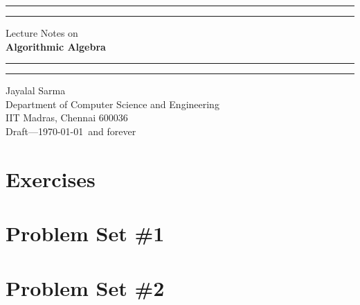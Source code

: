 \documentclass[11pt]{report}
\newcounter{excount}
\theoremstyle{plain}
\def\psetbackref{1}
\begin{document}
\thispagestyle{empty}

\begin{flushright}
\vspace*{3cm}
\makeatletter 
{}\p@ 
\hrule height 2pt
\p@
\hrule height 1pt
\p@
{\huge Lecture Notes on}\\[3ex]
{\Huge \textbf{Algorithmic Algebra}} 
\end{flushright}

\makeatletter 
{}\p@ 
\hrule height 2pt
\p@
\hrule height 1pt
\p@
\makeatother


\begin{flushleft}
{\large Jayalal Sarma\\ 
Department of Computer Science and Engineering\\
IIT Madras, Chennai 600036 \\[2ex]
Draft---\today\ and forever
}
\end{flushleft}

\newpage
{}  %

\newpage
\listoftodos

\newpage
\listofscribe          %

\newpage
\tableofcontents

\newpage 
{}  %
\newpage \setcounter{page}{1} 























\newpage
\section*{Exercises}
\setcounter{excount}{0}


\def\psetbackref{0}

\newpage
\section*{Problem Set \#1}
\begin{enumerate}[(1)]
\end{enumerate}

\newpage
\section*{Problem Set \#2}

\begin{enumerate}[(1)]
\end{enumerate}
\end{document}
